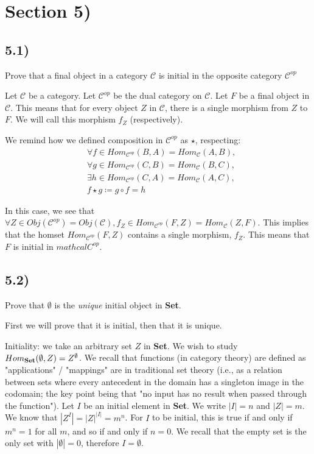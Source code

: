 \section*{Section 5)}

\subsection*{5.1)}

Prove that a final object in a category $\mathcal{C}$ is initial in the opposite category $\mathcal{C}^{op}$

Let $\mathcal{C}$ be a category. Let $\mathcal{C}^{op}$ be the dual category on $\mathcal{C}$. Let $F$ be a final object in $\mathcal{C}$. This means that for every object $Z$ in $\mathcal{C}$, there is a single morphism from $Z$ to $F$. We will call this morphism $f_Z$ (respectively).

We remind how we defined composition in $\mathcal{C}^{op}$ as $\star$, respecting:
$$
\begin{aligned}
	& \forall f \in Hom_{\mathcal{C}^{op}} (B, A) = Hom_{\mathcal{C}} (A, B), \\
	& \forall g \in Hom_{\mathcal{C}^{op}} (C, B) = Hom_{\mathcal{C}} (B, C), \\
	& \exists h \in Hom_{\mathcal{C}^{op}} (C, A) = Hom_{\mathcal{C}} (A, C), \\
	& f \star g \coloneqq g \circ f = h
\end{aligned}
$$

In this case, we see that $\forall Z \in Obj(\mathcal{C}^{op}) = Obj(\mathcal{C}), f_Z \in Hom_{\mathcal{C}^{op}} (F, Z) = Hom_{\mathcal{C}} (Z, F)$. This implies that the homset $Hom_{\mathcal{C}^{op}} (F, Z)$ contains a single morphism, $f_Z$. This means that $F$ is initial in $mathcal{C}^{op}$.




\subsection*{5.2)}

Prove that $\emptyset$ is the \textit{unique} initial object in \textbf{Set}.

First we will prove that it is initial, then that it is unique.

Initiality: we take an arbitrary set $Z$ in \textbf{Set}. We wish to study $Hom_{\text{\textbf{Set}}}(\emptyset, Z) = Z^\emptyset$. We recall that functions (in category theory) are defined as "applications" / "mappings" are in traditional set theory (i.e., as a relation between sets where every antecedent in the domain has a singleton image in the codomain; the key point being that "no input has no result when passed through the function"). Let $I$ be an initial element in \textbf{Set}. We write $|I| = n$ and $|Z| = m$. We know that $|Z^I| = |Z|^{|I|} = m^n$. For $I$ to be initial, this is true if and only if $m^n = 1$ for all $m$, and so if and only if $n = 0$. We recall that the empty set is the only set with $|\emptyset| = 0$, therefore $I = \emptyset$.


